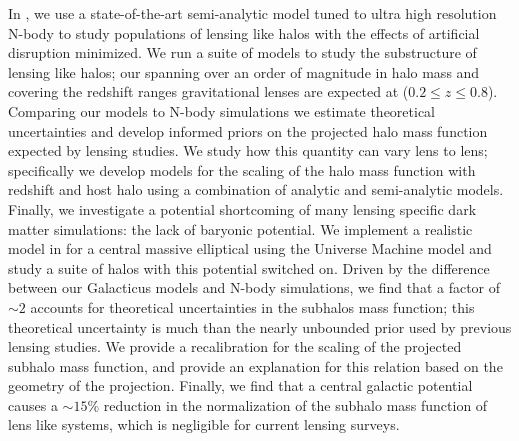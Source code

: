  
 In ,  we use a state-of-the-art semi-analytic \gal \cite{BENSON2012175} model tuned to ultra high resolution N-body to study populations of lensing like halos with the effects of artificial disruption minimized. 
 We run a suite of \gal models to study the substructure of lensing like halos; our spanning over an order of magnitude in halo mass and covering the redshift ranges gravitational lenses are expected at ($0.2 \leq z \leq 0.8$). 
 Comparing our \gal models to N-body simulations we estimate theoretical uncertainties and develop informed priors on the projected halo mass function expected by lensing studies. 
 We study how this quantity can vary lens to lens; specifically we develop models for the scaling of the halo mass function with redshift and host halo using a combination of analytic and semi-analytic models. 
 Finally, we investigate a potential shortcoming of many lensing specific dark matter simulations: the lack of baryonic potential. 
 We implement a realistic model in \gal for a central massive elliptical using the Universe Machine \cite{Behroozi_2019} model and study a suite of halos with this potential switched on. 
 Driven by the difference between our Galacticus models and N-body simulations, we find that a factor of $\sim 2$ accounts for theoretical uncertainties in the subhalos mass function; this theoretical uncertainty is much than the nearly unbounded prior used by previous lensing studies. 
 We provide a recalibration for the scaling of the projected subhalo mass function, and provide an explanation for this relation based on the geometry of the projection.
 Finally, we find that a central galactic potential causes a $\sim 15 \%$ reduction in the normalization of the subhalo mass function of lens like systems, which is negligible for current lensing surveys. 


